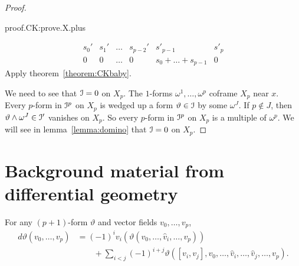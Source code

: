 \begin{proof}
\begin{answer}{proof.CK:prove.X.plus}
\begin{enumerate}
\[\begin{array}{cccccc}
s_0' & s_1' & \dots & s_{p-2}' & s'_{p-1} & s'_p \\
0      &    0    & \dots & 0            & s_0+\dots+s_{p-1} & 0
\end{array}
\]
Apply theorem~\vref{theorem:CKbaby}.
\end{enumerate}
\end{answer}
We need to see that \(\mathcal{I}=0\) on \(X_p\).
The \(1\)-forms \(\omega^1,\dots,\omega^p\) coframe \(X_p\) near \(x\).
Every \(p\)-form in \(\mathcal{I}^p\) on \(X_p\) is wedged up a form \(\vartheta\in\mathcal{I}\) by some \(\omega^J\).
If \(p\notin J\), then \(\vartheta\wedge\omega^J\in\mathcal{I}'\) vanishes on \(X_p\).
So every \(p\)-form in \(\mathcal{I}^p\) on \(X_p\) is a multiple of \(\omega^p\).
We will see in lemma~\vref{lemma:domino} that \(\mathcal{I}=0\) on \(X_p\).
\end{proof}

\section{Background material from differential geometry}
\begin{lemma}\label{lemma:Cartan.family}
For any \((p+1)\)-form \(\vartheta\) and vector fields \(v_0,\dots,v_p\),
\begin{align*}
d\vartheta(v_0,\dots,v_p)
&=
(-1)^i v_i (\vartheta(v_0,\dots,\hat{v}_i,\dots,v_p))
\\
& \qquad +
\sum_{i < j} (-1)^{i+j} \vartheta([v_i,v_j],v_0,\dots,\hat{v}_i,\dots,\hat{v}_j,\dots,v_p).
\end{align*}
\end{lemma}

